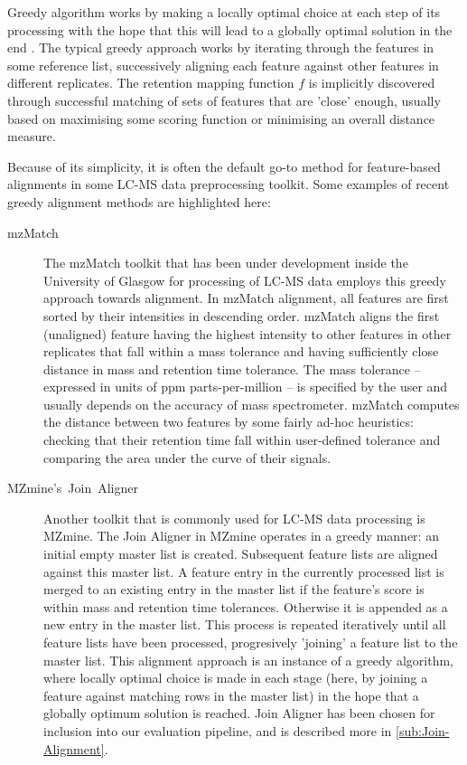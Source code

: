 Greedy algorithm works by making a locally optimal choice at each step of its processing with the hope that this will lead to a globally optimal solution in the end \cite{Cormen2009}. The typical greedy approach works by iterating through the features in some reference list, successively aligning each feature against other features in different replicates. The retention mapping function $f$ is implicitly discovered through successful matching of sets of features that are 'close' enough, usually based on maximising some scoring function or minimising an overall distance measure.

Because of its simplicity, it is often the default go-to method for feature-based alignments in some LC-MS data preprocessing toolkit.
Some examples of recent greedy alignment methods are highlighted here:

\begin{description}

\item [{mzMatch~\cite{Scheltema2011}}] The mzMatch toolkit that has been under development inside the University of Glasgow for processing of LC-MS data employs this greedy approach towards alignment. In mzMatch alignment, all features are first sorted by their intensities in descending order. mzMatch aligns the first (unaligned) feature having the highest intensity to other features in other replicates that fall within a mass tolerance and having sufficiently close distance in mass and retention time tolerance. The mass tolerance -- expressed in units of ppm parts-per-million -- is specified by the user and usually depends on the accuracy of mass spectrometer. mzMatch computes the distance between two features by some fairly ad-hoc heuristics: checking that their retention time fall within user-defined tolerance and comparing the area under the curve of their signals.

\item [{MZmine's~Join~Aligner~\cite{Pluskal2010}}] Another toolkit that is commonly used for LC-MS data processing is MZmine. The Join Aligner in MZmine operates in a greedy manner: an initial empty master list is created. Subsequent feature lists are aligned against this master list. A feature entry in the currently processed list is merged to an existing entry in the master list if the feature's score is within mass and retention time tolerances. Otherwise it is appended as a new entry in the master list. This process is repeated iteratively until all feature lists have been processed, progresively 'joining' a feature list to the master list. This alignment approach is an instance of a greedy algorithm, where locally optimal choice is made in each stage (here, by joining a feature against matching rows in the master list) in the hope that a globally optimum solution is reached. Join Aligner has been chosen for inclusion into our evaluation pipeline, and is described more in \ref{sub:Join-Alignment}.

\end{description}

